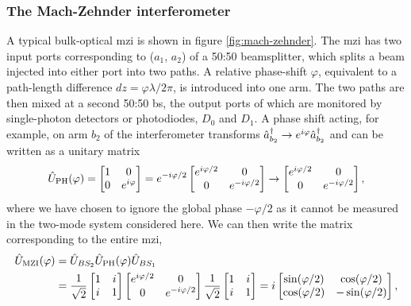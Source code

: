 \subsubsection{The Mach-Zehnder interferometer}
\label{sec:mach-zehnder-interferometer}
A typical bulk-optical \gls{mzi} is shown in figure \ref{fig:mach-zehnder}. The \gls{mzi} has two input ports corresponding to ($a_1$, $a_2$) of a 50:50 beamsplitter, which splits a beam injected into either port into two paths. A relative phase-shift $\varphi$, equivalent to a path-length difference $dz=\varphi \lambda / 2 \pi$, is introduced into one arm. The two paths are then mixed at a second 50:50 \gls{bs}, the output ports of which are monitored by single-photon detectors or photodiodes, $D_0$ and $D_1$. A phase shift acting, for example, on arm $b_2$ of the interferometer transforms $\hat{a}^{\dagger}_{b_2} \rightarrow e^{i\varphi} \hat{a}^{\dagger}_{b_2}$ and can be written as a unitary matrix
\begin{equation}
    \hat{U}_\text{PH}(\varphi) = 
    \begin{bmatrix}
        1 & 0 \\
        0 & e^{i \varphi} 
    \end{bmatrix}
    =
    e^{-i\varphi/2} 
    \begin{bmatrix}
        e^{i\varphi/2} & 0 \\
        0 & e^{-i \varphi/2} 
    \end{bmatrix}
    \rightarrow
    \begin{bmatrix}
        e^{i\varphi/2} & 0 \\
        0 & e^{-i \varphi/2} 
    \end{bmatrix}
    ,
    \label{eqn:phase-shift-unitary}
\end{equation}
where we have chosen to ignore the global phase $-\varphi/2$ as it cannot be measured in the two-mode system considered here.
We can then write the matrix corresponding to the entire \gls{mzi}, 
\begin{align}
    \hat{U}_{\mathrm{MZI}}(\varphi) 
    &=  \hat{U}_{BS_2} \hat{U}_\text{PH}(\varphi) \hat{U}_{BS_1}\\
    &= 
    \frac{1}{\sqrt{2}}
    \begin{bmatrix}
        1 & i \\
        i & 1
    \end{bmatrix}
    \begin{bmatrix}
        e^{i \varphi/2} & 0 \\
        0 & e^{-i \varphi/2} 
    \end{bmatrix}
    \frac{1}{\sqrt{2}}
    \begin{bmatrix}
        1 & i \\
        i & 1
    \end{bmatrix}
   = 
    i
    \begin{bmatrix}
    \sin(\varphi/2) & \cos(\varphi/2) \\
    \cos(\varphi/2) & -\sin(\varphi/2)
    \end{bmatrix}
    ,
    \label{eqn:mzi-to-bs}
\end{align}
